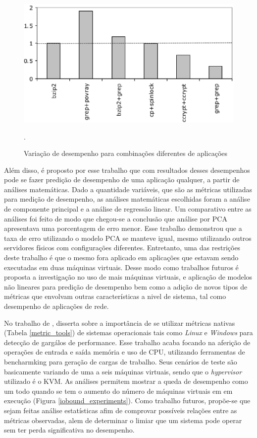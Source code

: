 \begin{figure}[!htb]
\centering
\includegraphics [keepaspectratio=true,scale=0.65]{figuras/interference_aplications.eps}
\caption{Variação de desempenho para combinações diferentes de aplicações}
\cite{koh2007}.
\label{interference_app}
\end{figure}

Além disso, é proposto por esse trabalho que com resultados desses desempenhos pode se fazer predição de desempenho de uma aplicação qualquer, a partir de análises matemáticas. Dado a quantidade variáveis, que são as métricas utilizadas para medição de desempenho, as análises matemáticas escolhidas foram a análise de componente principal e a análise de regressão linear. Um comparativo entre as análises foi feito de modo que chegou-se a conclusão que análise por PCA apresentava uma porcentagem de erro menor. Esse trabalho demonstrou que a taxa de erro utilizando o modelo PCA se manteve igual, mesmo utilizando outros servidores físicos com configurações diferentes. Entretanto, uma das restrições deste trabalho é que o mesmo fora aplicado em aplicações que estavam sendo executadas em duas máquinas virtuais. Desse modo como trabalhos futuros é proposta a investigação no uso de mais máquinas virtuais, e aplicação de modelos não lineares para predição de desempenho bem como a adição de novos tipos de métricas que envolvam outras características a nivel de sistema, tal como desempenho de aplicações de rede.

No trabalho de , disserta sobre a importância de se utilizar métricas nativas (Tabela \ref{metric_tools}) de sistemas  operacionais tais como \textit{Linux} e \textit{Windows} para detecção de gargálos de performance. Esse trabalho acaba focando na aferição de operações de entrada e saída memória e uso de CPU, utilizando ferramentas de bencharmking para geração de cargas de trabalho. Seus cenários de teste são basicamente variando de uma a seis máquinas virtuais, sendo que o \textit{hypervisor} utilizado é o KVM. As análises permitem mostrar a queda de desempenho como um todo quando se tem o aumento do número de máquinas virtuais em em execução (Figura \ref{iobound_experiments}). Como trabalho futuros, propõe-se que sejam feitas análise estatísticas afim de comprovar possíveis relações entre as métricas observadas, alem de determinar o limiar que um sistema pode operar sem ter perda significativa no desempenho.

